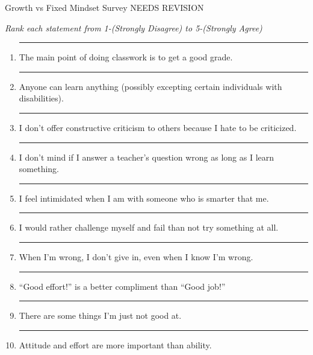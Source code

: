 \documentclass[letterpaper, 10pt]{article}
\begin{document}
	


\begin{center} Growth vs Fixed Mindset Survey NEEDS REVISION
\end{center}

\textit{Rank each statement from 1-(Strongly Disagree) to 5-(Strongly Agree)}



\begin{enumerate}


	

	\item \rule{.5in}{.01in}  The main point of doing classwork is to get a good grade.
	
	\item \rule{.5in}{.01in} Anyone can learn anything (possibly excepting certain individuals with disabilities).
	
	\item \rule{.5in}{.01in} I don't offer constructive criticism to others because I hate to be criticized.  
	
	\item \rule{.5in}{.01in} I don't mind if I answer a teacher's question wrong as long as I learn something.
	
	\item \rule{.5in}{.01in} I feel intimidated when I am with someone who is smarter that me.
	
	\item \rule{.5in}{.01in} I would rather challenge myself and fail than not try something at all.
	
	\item \rule{.5in}{.01in} When I'm wrong, I don't give in, even when I know I'm wrong.
	
	\item \rule{.5in}{.01in} ``Good effort!'' is a better compliment than ``Good job!''
	
	\item \rule{.5in}{.01in} There are some things I'm just not good at.
	
	\item \rule{.5in}{.01in} Attitude and effort are more important than ability.
	

\end{enumerate}
\end{document}
